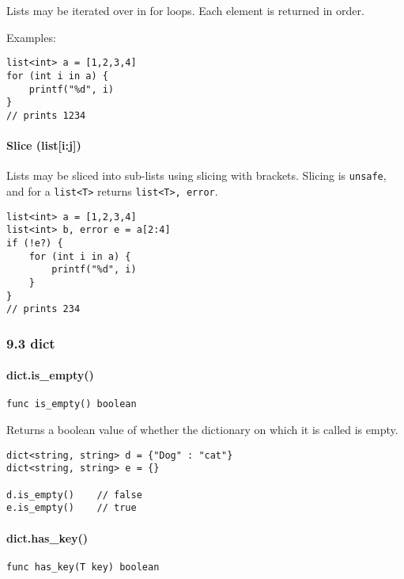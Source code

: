 Lists may be iterated over in for loops. Each element is returned in
order.

Examples:

\begin{verbatim}
list<int> a = [1,2,3,4]
for (int i in a) {
    printf("%d", i)
}
// prints 1234
\end{verbatim}

\paragraph{Slice (list{[}i:j{]})}\label{slice-listij}

Lists may be sliced into sub-lists using slicing with brackets. Slicing
is \texttt{unsafe}, and for a \texttt{list\textless{}T\textgreater{}}
returns \texttt{list\textless{}T\textgreater{}, error}.

\begin{verbatim}
list<int> a = [1,2,3,4]
list<int> b, error e = a[2:4]
if (!e?) {
    for (int i in a) {
        printf("%d", i)
    }
}
// prints 234
\end{verbatim}

\subsubsection{9.3 dict}\label{dict}

\paragraph{dict.is\_empty()}\label{dict.isux5fempty}

\begin{verbatim}
func is_empty() boolean
\end{verbatim}

Returns a boolean value of whether the dictionary on which it is called
is empty.

\begin{verbatim}
dict<string, string> d = {"Dog" : "cat"}
dict<string, string> e = {}

d.is_empty()    // false
e.is_empty()    // true
\end{verbatim}

\paragraph{dict.has\_key()}\label{dict.hasux5fkey}

\begin{verbatim}
func has_key(T key) boolean
\end{verbatim}

